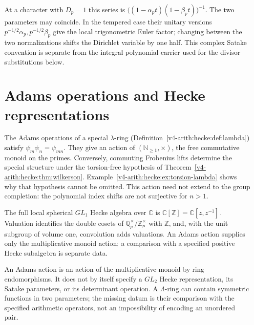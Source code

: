 At a character with \(D_p=1\) this series is
\(\bigl((1-\alpha_pt)(1-\beta_pt)\bigr)^{-1}\).
The two parameters may coincide. In the tempered case their unitary
versions \(p^{-1/2}\alpha_p,p^{-1/2}\beta_p\) give the local
trigonometric Euler factor; changing between the two normalizations
shifts the Dirichlet variable by one half.
This complex Satake convention is separate from the integral polynomial
carrier used for the divisor substitutions below.

\section{Adams operations and Hecke representations}
\label{v4-arith:kb:adams-not-hecke}

\begin{proposition}
\label{v4-arith:prop:adams-commutative-monoid}
The Adams operations of a special $\lambda$-ring
(Definition~\ref{v4-arith:hecke:def:lambda}) satisfy
$\psi_m\psi_n=\psi_{mn}$.
They give an action of $(\mathbb N_{\geq1},\times)$,
the free commutative monoid on the primes.
Conversely, commuting Frobenius lifts determine the special structure
under the torsion-free hypothesis of
Theorem~\ref{v4-arith:hecke:thm:wilkerson}.
Example~\ref{v4-arith:hecke:ex:torsion-lambda} shows why that
hypothesis cannot be omitted.
This action need not extend to the group completion: the polynomial
index shifts are not surjective for \(n>1\).

The full local spherical \(GL_1\) Hecke algebra over \(\mathbb C\)
is \(\mathbb C[\mathbb Z]=\mathbb C[z,z^{-1}]\).
Valuation identifies the double cosets of
\(\mathbb Q_p^\times/\mathbb Z_p^\times\) with \(\mathbb Z\), and,
with the unit subgroup of volume one, convolution adds valuations.
An Adams action supplies only the multiplicative monoid action;
a comparison with a specified positive Hecke subalgebra is separate
data.
\end{proposition}

\begin{observation}
\label{v4-arith:obs:gl1-vs-gl2}
An Adams action is an action of the multiplicative monoid by ring
endomorphisms. It does not by itself specify a \(GL_2\) Hecke
representation, its Satake parameters, or its determinant operation.
A \(\Lambda\)-ring can contain symmetric functions in two parameters;
the missing datum is their comparison with the specified arithmetic
operators, not an impossibility of encoding an unordered pair.
\end{observation}

